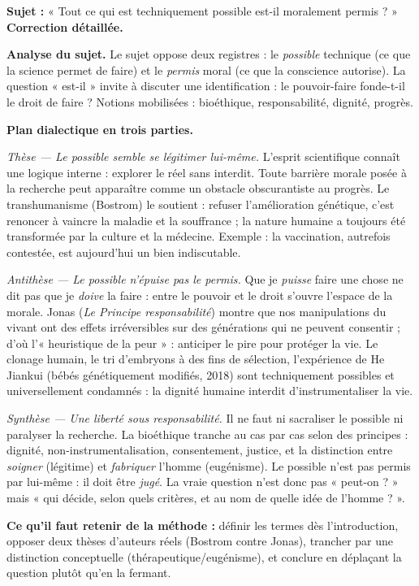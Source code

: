 \documentclass[11pt]{article}
\begin{document}
\begin{exoresolu}
\textbf{Sujet :} « Tout ce qui est techniquement possible est-il moralement permis ? »
\tcblower
\textbf{Correction détaillée.}

\textbf{Analyse du sujet.} Le sujet oppose deux registres : le \emph{possible} technique (ce que la science permet de faire) et le \emph{permis} moral (ce que la conscience autorise). La question « est-il » invite à discuter une identification : le pouvoir-faire fonde-t-il le droit de faire ? Notions mobilisées : bioéthique, responsabilité, dignité, progrès.

\textbf{Plan dialectique en trois parties.}

\emph{Thèse — Le possible semble se légitimer lui-même.} L'esprit scientifique connaît une logique interne : explorer le réel sans interdit. Toute barrière morale posée à la recherche peut apparaître comme un obstacle obscurantiste au progrès. Le transhumanisme (Bostrom) le soutient : refuser l'amélioration génétique, c'est renoncer à vaincre la maladie et la souffrance ; la nature humaine a toujours été transformée par la culture et la médecine. Exemple : la vaccination, autrefois contestée, est aujourd'hui un bien indiscutable.

\emph{Antithèse — Le possible n'épuise pas le permis.} Que je \emph{puisse} faire une chose ne dit pas que je \emph{doive} la faire : entre le pouvoir et le droit s'ouvre l'espace de la morale. Jonas (\emph{Le Principe responsabilité}) montre que nos manipulations du vivant ont des effets irréversibles sur des générations qui ne peuvent consentir ; d'où l'« heuristique de la peur » : anticiper le pire pour protéger la vie. Le clonage humain, le tri d'embryons à des fins de sélection, l'expérience de He Jiankui (bébés génétiquement modifiés, 2018) sont techniquement possibles et universellement condamnés : la dignité humaine interdit d'instrumentaliser la vie.

\emph{Synthèse — Une liberté sous responsabilité.} Il ne faut ni sacraliser le possible ni paralyser la recherche. La bioéthique tranche au cas par cas selon des principes : dignité, non-instrumentalisation, consentement, justice, et la distinction entre \emph{soigner} (légitime) et \emph{fabriquer} l'homme (eugénisme). Le possible n'est pas permis par lui-même : il doit être \emph{jugé}. La vraie question n'est donc pas « peut-on ? » mais « qui décide, selon quels critères, et au nom de quelle idée de l'homme ? ».

\textbf{Ce qu'il faut retenir de la méthode :} définir les termes dès l'introduction, opposer deux thèses d'auteurs réels (Bostrom contre Jonas), trancher par une distinction conceptuelle (thérapeutique/eugénisme), et conclure en déplaçant la question plutôt qu'en la fermant.
\end{exoresolu}
\end{document}
